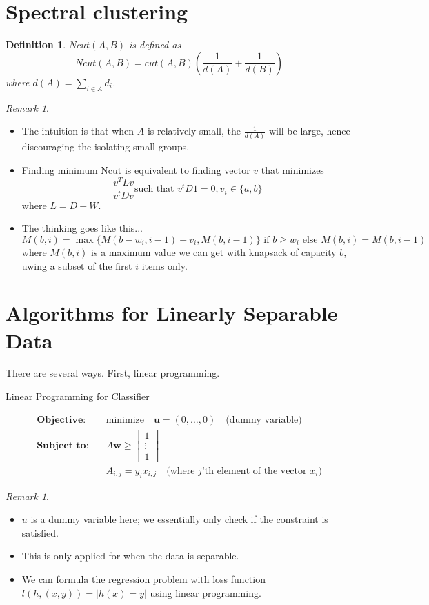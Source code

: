 \documentclass{article}
\newtheorem{definition}{Definition}
\theoremstyle{remark}
\newtheorem{remark}[example]{Remark}
\begin{document}
\section*{Spectral clustering}
\begin{definition}
$Ncut(A,B)$ is defined as $$Ncut(A,B) = cut(A,B)(\frac 1{d(A)}+\frac 1{d(B)})$$ where $d(A)=\sum_{i\in A}d_i$.
\end{definition}
\begin{remark}
\begin{itemize}
\item The intuition is that when $A$ is relatively small, the $\frac 1{d(A)}$ will be large, hence discouraging the isolating small groups.
\item Finding minimum Ncut is equivalent to finding vector $v$ that minimizes $$\frac{v^T Lv}{v^tDv}\text{such that }v^tD1=0,v_i\in\{a,b\}$$ where 
$L=D-W$.
\item The thinking goes like this... $M(b,i)=\max\{M(b-w_i,i-1)+v_i, M(b,i-1)\}\text{ if }b\geq w_i
\text{ else }M(b,i)=M(b,i-1)$ where $M(b,i)$ is a maximum value
we can get with knapsack of capacity $b$, uwing a subset of the first
$i$ items only.
\end{itemize}
\end{remark}

\section*{Algorithms for Linearly Separable Data}
There are several ways. First, linear programming.
\begin{algorithm}[H]
        \caption{Linear Programming for Classifier}
        \begin{align*}
        \textbf{Objective:} \quad & \text{minimize} \quad \mathbf{u} = (0, \ldots, 0) \quad \text{(dummy variable)} \\
        \textbf{Subject to:} \quad & A\mathbf{w} \geq \begin{bmatrix} 1 \\ \vdots \\ 1 \end{bmatrix} \\
        & A_{i,j} = y_i x_{i,j} \quad \text{(where \(j\)'th element of the vector \(x_i\))}
\end{align*}
\end{algorithm}
\begin{remark}
\begin{itemize}
\item $u$ is a dummy variable here; we essentially only check if the constraint is satisfied.
\item This is only applied for when the data is separable.
\item We can formula the regression problem with loss function $l(h, (x,y))=\lvert h(x)=y\rvert$ using linear programming.
\end{itemize}
\end{remark}
\end{document}
